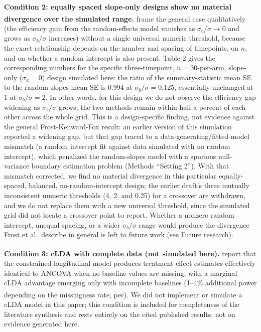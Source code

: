 \documentclass[
  11pt,
]{article}
\begin{document}
\textbf{Condition 2: equally spaced slope-only designs show
no material divergence over the simulated range.}\textsuperscript{} frame the general case
qualitatively (the efficiency gain from the
random-effects model vanishes as \(\sigma_b / \sigma \to
0\) and grows as \(\sigma_b / \sigma\) increases) without a
single universal numeric threshold, because the exact
relationship depends on the number and spacing of
timepoints, on \(n\), and on whether a random intercept is
also present. Table 2 gives the corresponding numbers for
the specific three-timepoint, \(n = 30\)-per-arm,
slope-only (\(\sigma_a = 0\)) design simulated here: the
ratio of the summary-statistic mean SE to the
random-slopes mean SE is 0.994 at
\(\sigma_b/\sigma = 0.125\), essentially unchanged at
1 at \(\sigma_b/\sigma = 2\). In
other words, for this design we do not observe the
efficiency gap widening as \(\sigma_b/\sigma\) grows; the
two methods remain within half a percent of each other
across the whole grid. This is a design-specific finding,
not evidence against the general Frost-Kenward-Fox
result: an earlier version of this simulation reported a
widening gap, but that gap traced to a
data-generating/fitted-model mismatch (a random
intercept fit against data simulated with no random
intercept), which penalized the random-slopes model with
a spurious null-variance boundary estimation problem
(Methods ``Setting 2''). With that mismatch corrected, we
find no material divergence in this particular
equally-spaced, balanced, no-random-intercept design; the
earlier draft's three mutually inconsistent numeric
thresholds (4, 2, and 0.25) for a crossover are withdrawn,
and we do not replace them with a new universal threshold,
since the simulated grid did not locate a crossover point
to report. Whether a nonzero random intercept, unequal
spacing, or a wider \(\sigma_b/\sigma\) range would produce
the divergence Frost et al.~describe in general is left to
future work (see Future research).

\textbf{Condition 3: cLDA with complete data (not simulated
here).}\textsuperscript{} report that the constrained
longitudinal model produces treatment effect estimates
effectively identical to ANCOVA when no baseline values
are missing, with a marginal cLDA advantage emerging only
with incomplete baselines (1--4\% additional power
depending on the missingness rate, per\textsuperscript{}). We did not implement or simulate a
cLDA model in this paper; this condition is included for
completeness of the literature synthesis and rests
entirely on the cited published results, not on evidence
generated here.
\end{document}
